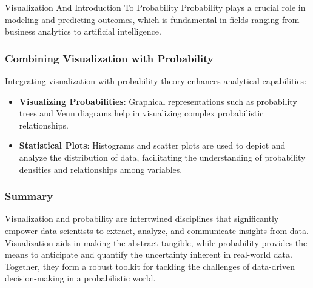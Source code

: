 \begin{notes}{Visualization And Introduction To Probability}
    Probability plays a crucial role in modeling and predicting outcomes, which is fundamental in fields ranging from business analytics to artificial intelligence.
    
    \subsubsection*{Combining Visualization with Probability}
    
    Integrating visualization with probability theory enhances analytical capabilities:
    \begin{itemize}
        \item \textbf{Visualizing Probabilities}: Graphical representations such as probability trees and Venn diagrams help in visualizing complex probabilistic relationships.
        \item \textbf{Statistical Plots}: Histograms and scatter plots are used to depict and analyze the distribution of data, facilitating the understanding of probability densities and relationships among variables.
    \end{itemize}
    
    \subsubsection*{Summary}
    
    Visualization and probability are intertwined disciplines that significantly empower data scientists to extract, analyze, and communicate insights from data. Visualization aids in making the 
    abstract tangible, while probability provides the means to anticipate and quantify the uncertainty inherent in real-world data. Together, they form a robust toolkit for tackling the challenges 
    of data-driven decision-making in a probabilistic world.    
\end{notes}